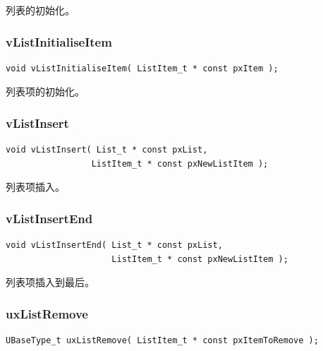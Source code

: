 \documentclass[12pt, a4paper]{article}
\begin{document}
列表的初始化。

\subsubsection {vListInitialiseItem}

\begin{lstlisting}[language={[ANSI]C},keywordstyle=\color{blue!70},commentstyle=\color{red!50!green!50!blue!50},frame=shadowbox, rulesepcolor=\color{red!20!green!20!blue!20}]
void vListInitialiseItem( ListItem_t * const pxItem );
\end{lstlisting}

列表项的初始化。

\subsubsection {vListInsert}

\begin{lstlisting}[language={[ANSI]C},keywordstyle=\color{blue!70},commentstyle=\color{red!50!green!50!blue!50},frame=shadowbox, rulesepcolor=\color{red!20!green!20!blue!20}]
void vListInsert( List_t * const pxList, 
                 ListItem_t * const pxNewListItem );
\end{lstlisting}

列表项插入。

\subsubsection {vListInsertEnd}

\begin{lstlisting}[language={[ANSI]C},keywordstyle=\color{blue!70},commentstyle=\color{red!50!green!50!blue!50},frame=shadowbox, rulesepcolor=\color{red!20!green!20!blue!20}]
void vListInsertEnd( List_t * const pxList,
                     ListItem_t * const pxNewListItem );
\end{lstlisting}

列表项插入到最后。

\subsubsection {uxListRemove}

\begin{lstlisting}[language={[ANSI]C},keywordstyle=\color{blue!70},commentstyle=\color{red!50!green!50!blue!50},frame=shadowbox, rulesepcolor=\color{red!20!green!20!blue!20}]
UBaseType_t uxListRemove( ListItem_t * const pxItemToRemove );
\end{lstlisting}
\end{document}
